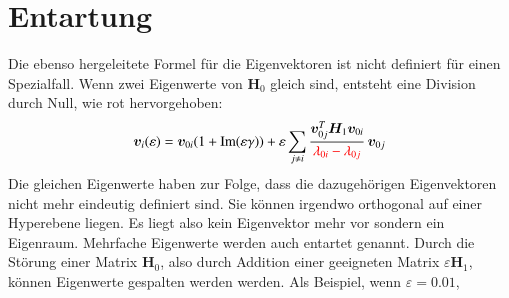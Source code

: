 \section{Entartung}

Die ebenso hergeleitete Formel  für die Eigenvektoren ist nicht definiert für einen Spezialfall.
Wenn zwei Eigenwerte von $\bm H_0$ gleich sind, entsteht eine Division durch Null, wie rot hervorgehoben:
\begin{equation*} %
    \bm v_i(\varepsilon)
    =
    \bm v_{0i} ( 1+ \mathrm{Im}(\varepsilon \gamma)) + \varepsilon \sum_{j \neq i}
    \frac{\bm v_{0j}^T \bm H_1 \bm v_{0i}}{\RD{\lambda_{0i} - \lambda_{0j}}}
    \, \bm v_{0j}
\end{equation*}
Die gleichen Eigenwerte haben zur Folge, dass die dazugehörigen Eigenvektoren nicht mehr eindeutig definiert sind.
Sie können irgendwo orthogonal auf einer Hyperebene liegen.
Es liegt also kein Eigenvektor mehr vor sondern ein Eigenraum.
Mehrfache Eigenwerte werden auch entartet genannt.
Durch die Störung einer Matrix $\bm H_0$, also durch Addition einer geeigneten Matrix $\varepsilon \bm H_1$, können Eigenwerte gespalten werden werden.
Als Beispiel, wenn $\varepsilon = 0.01$,
